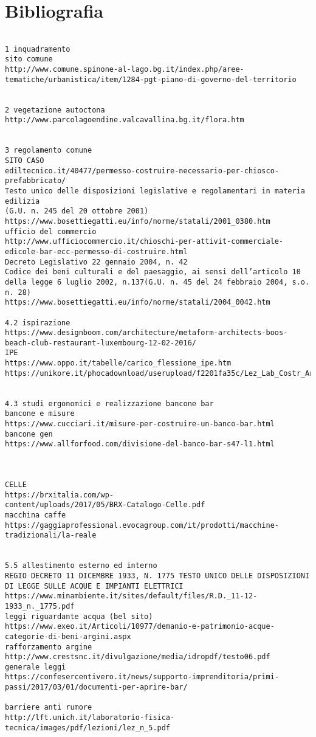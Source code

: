 \section{Bibliografia}
\begin{verbatim}

1 inquadramento 
sito comune 
http://www.comune.spinone-al-lago.bg.it/index.php/aree-tematiche/urbanistica/item/1284-pgt-piano-di-governo-del-territorio


2 vegetazione autoctona
http://www.parcolagoendine.valcavallina.bg.it/flora.htm


3 regolamento comune
SITO CASO
ediltecnico.it/40477/permesso-costruire-necessario-per-chiosco-prefabbricato/
Testo unico delle disposizioni legislative e regolamentari in materia edilizia
(G.U. n. 245 del 20 ottobre 2001)
https://www.bosettiegatti.eu/info/norme/statali/2001_0380.htm
ufficio del commercio 
http://www.ufficiocommercio.it/chioschi-per-attivit-commerciale-edicole-bar-ecc-permesso-di-costruire.html
Decreto Legislativo 22 gennaio 2004, n. 42
Codice dei beni culturali e del paesaggio, ai sensi dell’articolo 10 della legge 6 luglio 2002, n.137(G.U. n. 45 del 24 febbraio 2004, s.o. n. 28)
https://www.bosettiegatti.eu/info/norme/statali/2004_0042.htm

4.2 ispirazione 
https://www.designboom.com/architecture/metaform-architects-boos-beach-club-restaurant-luxembourg-12-02-2016/
IPE
https://www.oppo.it/tabelle/carico_flessione_ipe.htm
https://unikore.it/phocadownload/userupload/f2201fa35c/Lez_Lab_Costr_Arch_Strutture%20Acciaio.pdf


4.3 studi ergonomici e realizzazione bancone bar
bancone e misure 
https://www.cucciari.it/misure-per-costruire-un-banco-bar.html
bancone gen
https://www.allforfood.com/divisione-del-banco-bar-s47-l1.html



CELLE
https://brxitalia.com/wp-
content/uploads/2017/05/BRX-Catalogo-Celle.pdf
macchina caffe 
https://gaggiaprofessional.evocagroup.com/it/prodotti/macchine-tradizionali/la-reale


5.5 allestimento esterno ed interno
REGIO DECRETO 11 DICEMBRE 1933, N. 1775 TESTO UNICO DELLE DISPOSIZIONI DI LEGGE SULLE ACQUE E IMPIANTI ELETTRICI 
https://www.minambiente.it/sites/default/files/R.D._11-12-1933_n._1775.pdf
leggi riguardante acqua (bel sito) 
https://www.exeo.it/Articoli/10977/demanio-e-patrimonio-acque-categorie-di-beni-argini.aspx
rafforzamento argine 
http://www.crestsnc.it/divulgazione/media/idropdf/testo06.pdf
generale leggi 
https://confesercentivero.it/news/supporto-imprenditoria/primi-passi/2017/03/01/documenti-per-aprire-bar/

barriere anti rumore 
http://lft.unich.it/laboratorio-fisica-tecnica/images/pdf/lezioni/lez_n_5.pdf

\end{verbatim}
